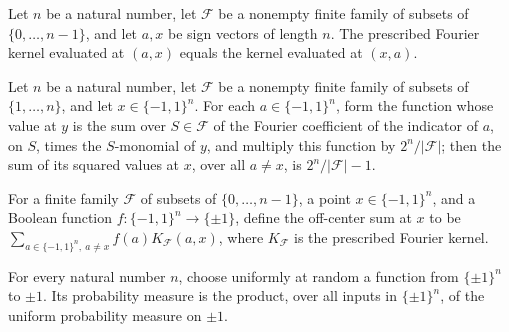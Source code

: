\begin{theorem}
\label{FABL.prescribedFourierKernel_comm}
\leanok
{}
Let $n$ be a natural number, let $\mathcal F$ be a nonempty finite family of subsets of
$\{0,\ldots,n-1\}$, and let $a,x$ be sign vectors of length $n$. The prescribed Fourier
kernel evaluated at $(a,x)$ equals the kernel evaluated at $(x,a)$.
\end{theorem}

\begin{theorem}
\label{FABL.sum_ne_sq_prescribedFourierKernel}
\leanok
{}
Let $n$ be a natural number, let $\mathcal F$ be a nonempty finite family of subsets of
$\{1,\ldots,n\}$, and let $x\in\{-1,1\}^n$. For each $a\in\{-1,1\}^n$, form the function
whose value at $y$ is the sum over $S\in\mathcal F$ of the Fourier coefficient of the
indicator of $a$, on $S$, times the $S$-monomial of $y$, and multiply this function by
$2^n/|\mathcal F|$; then the sum of its squared values at $x$, over all $a\ne x$, is
$2^n/|\mathcal F|-1$.
\end{theorem}

\begin{definition}
\label{FABL.prescribedFourierOffCenterSum}
\leanok
{}
For a finite family $\mathcal F$ of subsets of $\{0,\ldots,n-1\}$, a point
$x\in\{-1,1\}^n$, and a Boolean function $f:\{-1,1\}^n\to\{\pm1\}$, define the
off-center sum at $x$ to be $\sum_{a\in\{-1,1\}^n,\ a\ne x} f(a)K_{\mathcal F}(a,x)$,
where $K_{\mathcal F}$ is the prescribed Fourier kernel.
\end{definition}

\begin{theorem}
\label{FABL.uniformBooleanFunction_toMeasure_eq_pi}
\leanok
{}
For every natural number $n$, choose uniformly at random a function from $\{\pm1\}^n$ to
$\pm1$. Its probability measure is the product, over all inputs in $\{\pm1\}^n$, of the
uniform probability measure on $\pm1$.
\end{theorem}

